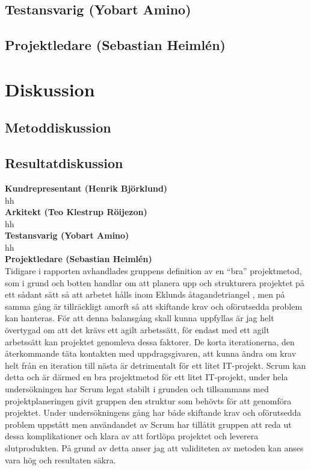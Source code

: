 \documentclass[conference,a4paper]{IEEEtran}
\begin{document}
\subsection{Testansvarig (Yobart Amino)}

\subsection{Projektledare (Sebastian Heimlén)}

\section{Diskussion} \label{sec:disk}

\subsection{Metoddiskussion}

\subsection{Resultatdiskussion}

\noindent \textbf{Kundrepresentant (Henrik Björklund)}\\
hh
\\

\noindent \textbf{Arkitekt (Teo Klestrup Röijezon)}\\
hh
\\

\noindent \textbf{Testansvarig (Yobart Amino)}\\
hh
\\

\noindent \textbf{Projektledare (Sebastian Heimlén)}\\
Tidigare i rapporten avhandlades gruppens definition av en ``bra'' projektmetod, som i grund och botten handlar om att planera upp och strukturera projektet på ett sådant sätt så att arbetet hålls inom Eklunds åtagandetriangel \cite[s. 128-129]{Eklund14}, men på samma gång är tillräckligt amorft så att skiftande krav och oförutsedda problem kan hanteras. För att denna balansgång skall kunna uppfyllas är jag helt övertygad om att det krävs ett agilt arbetssätt, för endast med ett agilt arbetssätt kan projektet genomleva dessa faktorer. De korta iterationerna, den återkommande täta kontakten med uppdragsgivaren, att kunna ändra om krav helt från en iteration till nästa är detrimentalt för ett litet IT-projekt. Scrum kan detta och är därmed en bra projektmetod för ett litet IT-projekt, under hela undersökningen har Scrum legat stabilt i grunden och tillsammans med projektplaneringen givit gruppen den struktur som behövts för att genomföra projektet. Under undersökningens gång har både skiftande krav och oförutsedda problem uppstått men användandet av Scrum har tillåtit gruppen att reda ut dessa komplikationer och klara av att fortlöpa projektet och leverera slutprodukten. På grund av detta anser jag att validiteten av metoden kan anses vara hög och resultaten säkra.
\end{document}
